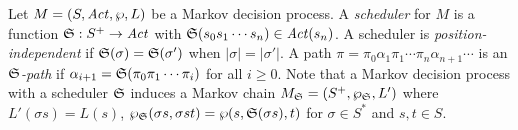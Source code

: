 Let $M = (S, \mathit{Act}, \wp, L)$ be a Markov decision process. A
\emph{scheduler} for $M$ is a function $\mathfrak{S} : S^+
\rightarrow \mathit{Act}$ with $\mathfrak{S}(s_0s_1\cdots s_n) \in
\mathit{Act}(s_n)$. A scheduler is \emph{position-independent} if
$\mathfrak{S}(\sigma) = \mathfrak{S}(\sigma')$ when $|\sigma| =
|\sigma'|$. 
A path $\pi =
\pi_0 \alpha_1 \pi_1 \cdots \pi_n \alpha_{n+1} \cdots$ is an
\emph{$\mathfrak{S}$-path} if $\alpha_{i+1} = \mathfrak{S}(\pi_0
\pi_1 \cdots \pi_i)$ for all $i \geq 0$. 
Note that a Markov decision process with a
scheduler $\mathfrak{S}$ induces a Markov chain $M_{\mathfrak{S}} =
(S^+, \wp_{\mathfrak{S}}, L')$ where $L' (\sigma s) = L (s)$, 
$\wp_{\mathfrak{S}} (\sigma s, \sigma s t) = \wp (s,
\mathfrak{S}(\sigma s), t)$ for $\sigma \in S^*$ and $s, t \in S$.

